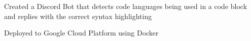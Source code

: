\documentclass[]{resume-template}
\begin{document}
\begin{minipage}[t]{0.66\textwidth}
    \label{subsec:neatbot}
    \begin{tightemize}
        \item Created a Discord Bot that detects code languages being used in a code block and replies with the correct syntax highlighting
        \item Deployed to Google Cloud Platform using Docker
    \end{tightemize}




    \sectionsep{}





\end{minipage}
\end{document}
